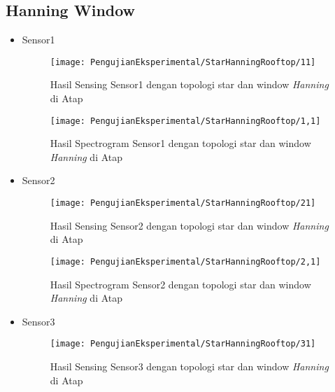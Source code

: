 \subsection{Hanning Window}
\begin{itemize}
\item Sensor1
\begin{figure}[H]
	\centering
	\texttt{[image: PengujianEksperimental/StarHanningRooftop/11]}
	\caption[Hasil Sensing Sensor1 dengan topologi star dan window {\it Hanning} di Atap]{Hasil Sensing Sensor1 dengan topologi star dan window {\it Hanning} di Atap} 
	\label{fig:hasilAtapStarHann11}
\end{figure}

\begin{figure}[H]
	\centering
	\texttt{[image: PengujianEksperimental/StarHanningRooftop/1,1]}
	\caption[Hasil Spectrogram Sensor1 dengan topologi star dan window {\it Hanning} di Atap]{Hasil Spectrogram Sensor1 dengan topologi star dan window {\it Hanning} di Atap} 
	\label{fig:hasilAtapStarHann1,1}
\end{figure}

\item Sensor2
\begin{figure}[H]
	\centering
	\texttt{[image: PengujianEksperimental/StarHanningRooftop/21]}
	\caption[Hasil Sensing Sensor2 dengan topologi star dan window {\it Hanning} di Atap]{Hasil Sensing Sensor2 dengan topologi star dan window {\it Hanning} di Atap} 
	\label{fig:hasilAtapStarHann21}
\end{figure}

\begin{figure}[H]
	\centering
	\texttt{[image: PengujianEksperimental/StarHanningRooftop/2,1]}
	\caption[Hasil Spectrogram Sensor2 dengan topologi star dan window {\it Hanning} di Atap]{Hasil Spectrogram Sensor2 dengan topologi star dan window {\it Hanning} di Atap} 
	\label{fig:hasilAtapStarHann2,1}
\end{figure}

\item Sensor3
\begin{figure}[H]
	\centering
	\texttt{[image: PengujianEksperimental/StarHanningRooftop/31]}
	\caption[Hasil Sensing Sensor3 dengan topologi star dan window {\it Hanning} di Atap]{Hasil Sensing Sensor3 dengan topologi star dan window {\it Hanning} di Atap} 
	\label{fig:hasilAtapStarHann31}
\end{figure}


\end{itemize}
